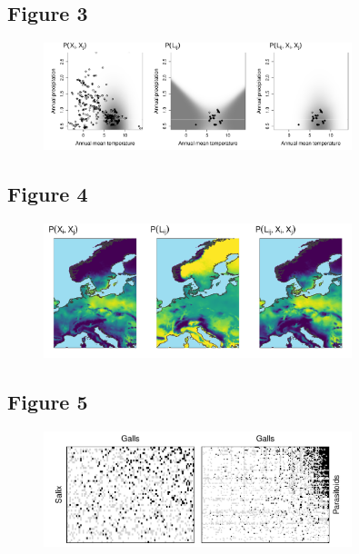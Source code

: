 \documentclass[12pt]{article}
\begin{document}
\newpage

\subsection*{Figure 3}

\begin{figure}[ht!]
\centering\includegraphics[width=0.8\textwidth]{figures/example_pair}
\end{figure}

\newpage

\subsection*{Figure 4}

\begin{figure}[ht!]
\centering\includegraphics[width=0.8\textwidth]{figures/map_pair}
\end{figure}

\newpage

\subsection*{Figure 5}

\begin{figure}[ht!]
\centering\includegraphics[width=0.8\textwidth]{figures/mw_holes}
\end{figure}
\end{document}
